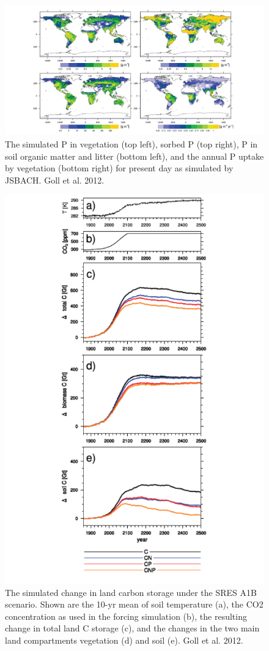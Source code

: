 \documentclass[12pt,oneside]{book}
\begin{document}
\begin{figure}

{\centering \includegraphics[width=0.8\linewidth]{figures/chap5/f522_goll_Pmaps} 

}

\caption{The simulated P in vegetation (top left), sorbed P (top right), P in soil organic matter and litter (bottom left), and the annual P uptake by vegetation (bottom right) for present day as simulated by JSBACH. Goll et al. 2012.}\label{fig:f522}
\end{figure}

\begin{figure}

{\centering \includegraphics[width=0.8\linewidth]{figures/chap5/f523_goll_sink} 

}

\caption{The simulated change in land carbon storage under the SRES A1B scenario. Shown are the 10-yr mean of soil temperature (a), the CO2 concentration as used in the forcing simulation (b), the resulting change in total land C storage (c), and the changes in the two main land compartments vegetation (d) and soil (e). Goll et al. 2012.}\label{fig:f523}
\end{figure}
\end{document}
